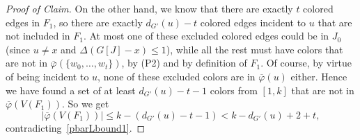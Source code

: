 \documentclass[10pt,a4paper]{amsart}
\newcommand{\pbar}{\overline{\varphi}}
\newenvironment{proofc}{\begin{proof}[Proof of Claim]}{\end{proof}}
\begin{document}
\begin{proofc}
On the other hand, we know that there are exactly $t$ colored edges in $F_1$,  so there are exactly $d_{G'}(u)-t$ colored edges incident to $u$ that are not included in $F_1$. At most one of these excluded colored edges could be in $J_0$ (since $u\neq x$ and $\Delta(G[J]-x) \le 1$), while all the rest must have colors that are not in $\pbar(\{w_0, \ldots, w_t\})$, by (P2) and by definition of $F_1$. Of course, by virtue of being incident to $u$, none of these excluded colors are in $\pbar(u)$ either. Hence we have found a set of at least $d_{G'}(u)-t-1$ colors from $[1,k]$ that are not in $\pbar(V(F_1))$. So we get 
$$|\pbar(V(F_1))| \leq k-(d_{G'}(u)-t-1)< k-d_{G'}(u)+ 2+ t,$$
contradicting~\eqref{pbarLbound1}. 
\end{proofc}
\end{document}

